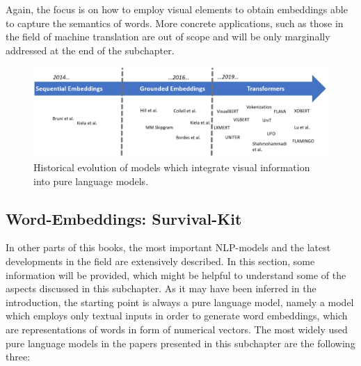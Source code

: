 \documentclass[
]{krantz}
\begin{document}
Again, the focus is on how to employ visual elements to obtain embeddings able to capture the semantics of words. More concrete applications, such as those in the field of machine translation are out of scope and will be only marginally addressed at the end of the subchapter.

\begin{figure}

{\centering \includegraphics[width=1\linewidth]{figures/02-03-img-support-text/Img-Hist} 

}

\caption{Historical evolution of models which integrate visual information into pure language models. }\label{fig:img-hist}
\end{figure}

\hypertarget{word-embeddings-survival-kit}{%
\subsection{Word-Embeddings: Survival-Kit}\label{word-embeddings-survival-kit}}

In other parts of this books, the most important NLP-models and the latest developments in the field are extensively described. In this section, some information will be provided, which might be helpful to understand some of the aspects discussed in this subchapter. As it may have been inferred in the introduction, the starting point is always a pure language model, namely a model which employs only textual inputs in order to generate word embeddings, which are representations of words in form of numerical vectors.
The most widely used pure language models in the papers presented in this subchapter are the following three:
\end{document}
